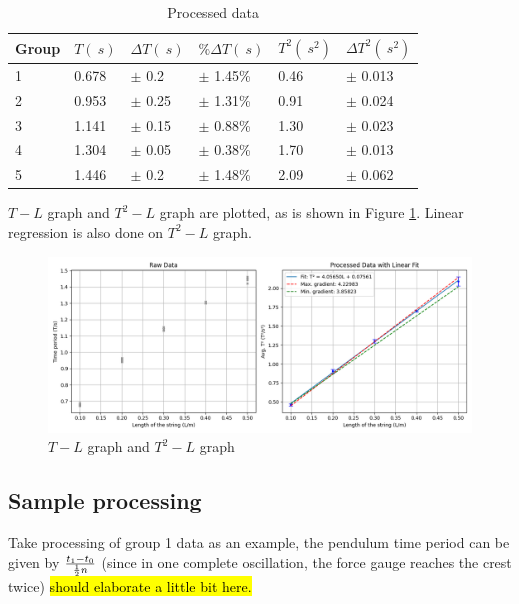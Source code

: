 \documentclass[a4paper]{article}
\newcommand{\grayrow}{\rowcolor[gray]{0.925}}
\begin{document}
\begin{table}[!ht]
    \centering
    \caption{Processed data}
    \label{tab.proc}
    \vspace{0.2cm}
    \begin{tabularx}{0.9\textwidth}{XXXXXX}
    \hline
        Group & $T(\SI{}{s})$ & $\Delta T(\SI{}{s})$ & $\%\Delta T(\SI{}{s})$ & $T^2(\SI{}{s^2})$ & $\Delta T^2(\SI{}{s^2})$   \\ \hline
        \grayrow 1 & 0.678  & $\pm$ 0.2 & $\pm$ 1.45\% & 0.46  & $\pm$ 0.013   \\ %
        2 & 0.953  & $\pm$ 0.25 & $\pm$ 1.31\% & 0.91  & $\pm$ 0.024   \\ %
        \grayrow 3 & 1.141  & $\pm$ 0.15 & $\pm$ 0.88\% & 1.30  & $\pm$ 0.023   \\ %
        4 & 1.304  & $\pm$ 0.05 & $\pm$ 0.38\% & 1.70  & $\pm$ 0.013   \\ %
        \grayrow 5 & 1.446  & $\pm$ 0.2 & $\pm$ 1.48\% & 2.09  & $\pm$ 0.062   \\ \hline
    \end{tabularx}
\end{table}

$T-L$ graph and $T^2-L$ graph are plotted, as is shown in Figure \ref{fig.proc}. Linear regression is also done on $T^2-L$ graph. 

\begin{figure}[ht]
    \centering
    \includegraphics[width = \textwidth]{figure/Figure_1.png}
    \caption{$T-L$ graph and $T^2 - L$ graph}
    \label{fig.proc}
\end{figure}

\subsection{Sample processing}

Take processing of group 1 data as an example, the pendulum time period can be given by $t_1-t_0\over \frac{1}{2} n$ (since in one complete oscillation, the force gauge reaches the crest twice) \hl{should elaborate a little bit here.}
\end{document}
